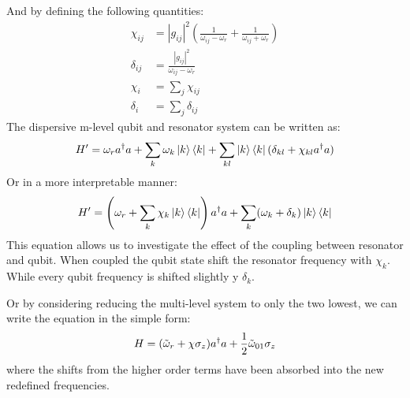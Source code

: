 And by defining the following quantities:
\begin{align}
    \chi_{ij} &= |g_{ij}|^2 \left(\frac{1}{\omega_{ij} - \omega_r} + \frac{1}{\omega_{ij} + \omega_r} \right) \\
    \delta_{ij} &= \frac{|g_{ij}|^2 }{\omega_{ij} - \omega_r} \\
    \chi_{i} &= \sum_j \chi_{ij} \\
    \delta_{i} &= \sum_j \delta_{ij} 
\end{align}
The dispersive m-level qubit and resonator system can be written as:
\begin{equation}
    H' = \omega_r a^\dagger a + \sum_k \omega_k \ket{k}\bra{k} + \sum_{kl}\ket{k}\bra{k}(\delta_{kl} + \chi_{kl} a^\dagger a )
\end{equation}
Or in a more interpretable manner:
\begin{equation} \label{eq:multi_qubit_dispersive_hamiltonian}
    H' = \left(\omega_r + \sum_k \chi_k \ket{k}\bra{k} \right) a^\dagger a + \sum_k (\omega_k + \delta_k)\ket{k}\bra{k}
\end{equation}
This equation allows us to investigate the effect of the coupling between resonator and qubit. When coupled the qubit state shift the resonator frequency with $\chi_k$. While every qubit frequency is shifted slightly y $\delta_k$.


Or by considering reducing the multi-level system to only the two lowest, we can write the equation in the simple form:
\begin{equation}\label{eq:two_level_qubit_dispersive}
    H = (\Tilde{\omega}_r + \chi \sigma_z) a^\dagger a + \frac12 \Tilde{\omega}_{01} \sigma_z
\end{equation}
where the shifts from the higher order terms have been absorbed into the new redefined frequencies.

